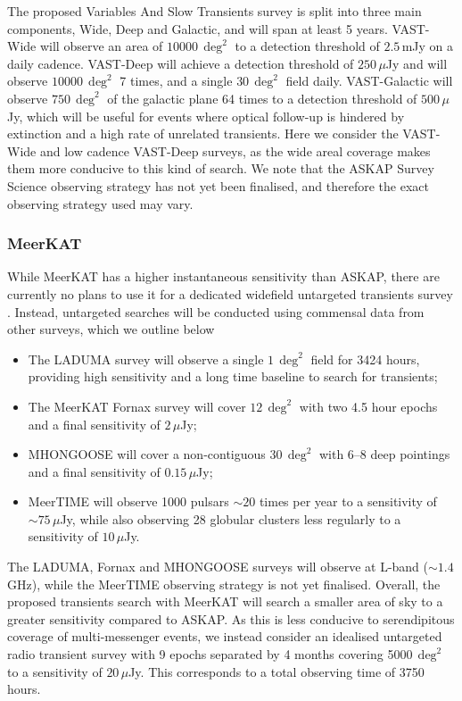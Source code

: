 The proposed Variables And Slow Transients \citep[VAST;][]{2013PASA...30....6M} survey is split into three main components, Wide, Deep and Galactic, and will span at least 5 years. VAST-Wide will observe an area of $10000\,\deg^2$ to a detection threshold of $2.5\,$mJy on a daily cadence. VAST-Deep will achieve a detection threshold of $250\,\mu$Jy and will observe $10000\,\deg^2$ 7 times, and a single $30\,\deg^2$ field daily. VAST-Galactic will observe $750\,\deg^2$ of the galactic plane 64 times to a detection threshold of $500\,\mu$Jy, which will be useful for events where optical follow-up is hindered by extinction and a high rate of unrelated transients. Here we consider the VAST-Wide and low cadence VAST-Deep surveys, as the wide areal coverage makes them more conducive to this kind of search. We note that the ASKAP Survey Science observing strategy has not yet been finalised, and therefore the exact observing strategy used may vary.
\pagebreak
\subsubsection{MeerKAT}
\vspace{-6pt}
While MeerKAT has a higher instantaneous sensitivity than ASKAP, there are currently no plans to use it for a dedicated widefield untargeted transients survey \citep{2017arXiv171104132F}. Instead, untargeted searches will be conducted using commensal data from other surveys, which we outline below 

\begin{itemize}
    \item The LADUMA survey \citep{2012IAUS..284..496H} will observe a single $1\,\deg^2$ field for 3424 hours, providing high sensitivity and a long time baseline to search for transients;
    \item The MeerKAT Fornax survey \citep{2016mks..confE...8S} will cover $12\,\deg^2$ with two 4.5 hour epochs and a final sensitivity of $2\,\mu$Jy;
    \item MHONGOOSE \citep{2016mks..confE...7D} will cover a non-contiguous $30\,\deg^2$ with 6--8 deep pointings and a final sensitivity of $0.15\,\mu$Jy;
    \item MeerTIME \citep{2018arXiv180307424B} will observe 1000 pulsars $\sim 20$ times per year to a sensitivity of $\sim75\,\mu$Jy, while also observing 28 globular clusters less regularly to a sensitivity of $10\,\mu$Jy.
\end{itemize}
The LADUMA, Fornax and MHONGOOSE surveys will observe at L-band ($\sim 1.4$\,GHz), while the MeerTIME observing strategy is not yet finalised. Overall, the proposed transients search with MeerKAT will search a smaller area of sky to a greater sensitivity compared to ASKAP. As this is less conducive to serendipitous coverage of multi-messenger events, we instead consider an idealised untargeted radio transient survey with 9 epochs separated by 4 months covering 5000\,$\deg^2$ to a sensitivity of $20\,\mu$Jy. This corresponds to a total observing time of 3750 hours.
\vspace{-18pt}
